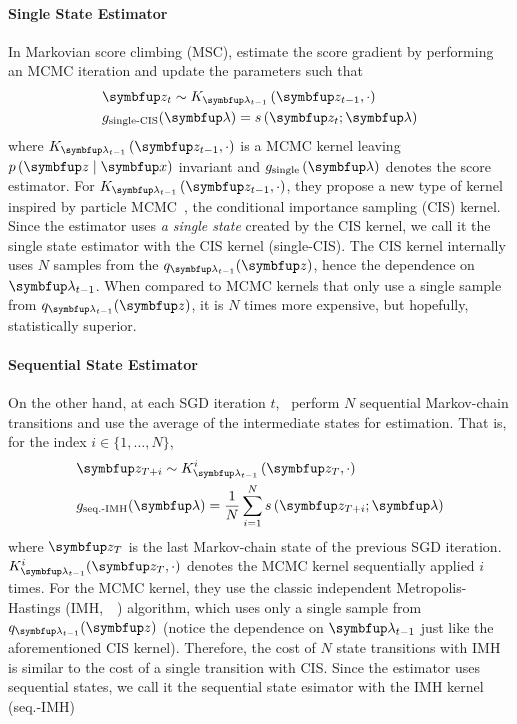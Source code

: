 \vspace{-0.05in}
\paragraph{Single State Estimator}
In Markovian score climbing (MSC), \citeauthor{NEURIPS2020_b2070693} estimate the score gradient by performing an MCMC iteration and update the parameters such that
\vspace{-0.05in}
\begin{align*}
  &\vz_t \sim K_{\vlambda_{t-1}}\left(\vz_{t-1}, \cdot \right) \\
  &g_{\text{single-CIS}}(\vlambda) = s\,(\vz_t; \vlambda)
\end{align*}
where \(K_{\vlambda_{t-1}}\left(\vz_{t-1}, \cdot\right)\) is a MCMC kernel leaving \(p\,(\vz\mid\vx)\) invariant and \(g_{\text{single}}\left(\vlambda\right)\) denotes the score estimator.
For \(K_{\vlambda_{t-1}}\left(\vz_{t-1}, \cdot\right)\), they propose a new type of kernel inspired by particle MCMC~\citep{andrieu_particle_2010, andrieu_uniform_2018}, the conditional importance sampling (CIS) kernel.
Since the estimator uses \textit{a single state} created by the CIS kernel, we call it the single state estimator with the CIS kernel (single-CIS).
The CIS kernel internally uses \(N\) samples from the \(q_{\vlambda_{t-1}}(\vz)\), hence the dependence on \(\vlambda_{t-1}\).
When compared to MCMC kernels that only use a single sample from \(q_{\vlambda_{t-1}}(\vz)\), it is \(N\) times more expensive, but hopefully, statistically superior.

\vspace{-0.05in}
\paragraph{Sequential State Estimator}
On the other hand, at each SGD iteration \(t\),~\citep{pmlr-v124-ou20a} perform \(N\) sequential Markov-chain transitions and use the average of the intermediate states for estimation.
That is, for the index \(i \in \{1, \ldots, N\}\),
\vspace{-0.05in}
\begin{align*}
  &\vz_{T+i} \sim K_{\vlambda_{t-1}}^i\left(\vz_{T}, \cdot \right) \\
  &g_{\text{seq.-IMH}}(\vlambda) = \frac{1}{N} \sum_{i=1}^N s\,(\vz_{T+i}; \vlambda)
\end{align*}
where \(\vz_T\) is the last Markov-chain state of the previous SGD iteration.
\(K^{i}_{\vlambda_{t-1}}(\vz_{T}, \cdot)\) denotes the MCMC kernel sequentially applied \(i\) times.
For the MCMC kernel, they use the classic independent Metropolis-Hastings (IMH,~\citealt[Algorithm 25]{robert_monte_2004}~\citealt{hastings_monte_1970}) algorithm, which uses only a single sample from \(q_{\vlambda_{t-1}}(\vz)\) (notice the dependence on \(\vlambda_{t-1}\) just like the aforementioned CIS kernel).
Therefore, the cost of \(N\) state transitions with IMH is similar to the cost of a single transition with CIS.
Since the estimator uses sequential states, we call it the sequential state esimator with the IMH kernel (seq.-IMH)

